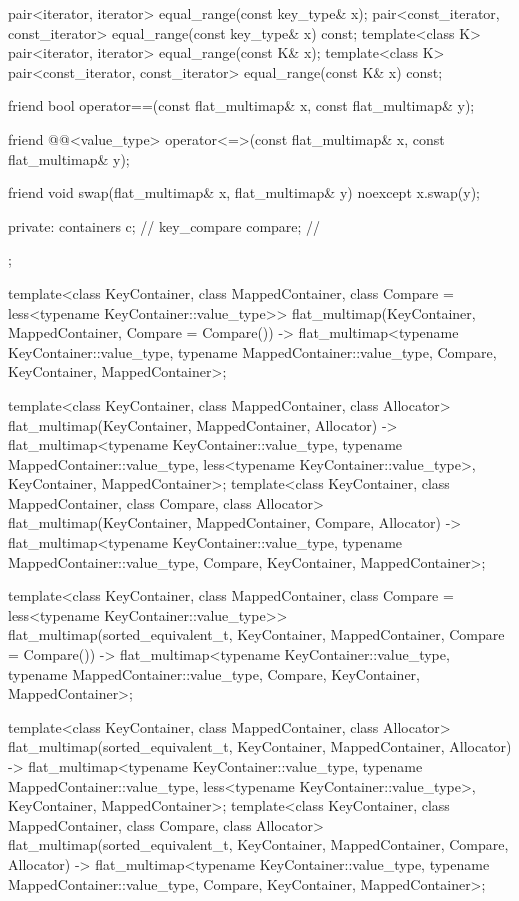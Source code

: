 \begin{codeblock}
{{    pair<iterator, iterator> equal_range(const key_type& x);
    pair<const_iterator, const_iterator> equal_range(const key_type& x) const;
    template<class K>
      pair<iterator, iterator> equal_range(const K& x);
    template<class K>
      pair<const_iterator, const_iterator> equal_range(const K& x) const;

    friend bool operator==(const flat_multimap& x, const flat_multimap& y);

    friend @@<value_type>
      operator<=>(const flat_multimap& x, const flat_multimap& y);

    friend void swap(flat_multimap& x, flat_multimap& y) noexcept
      { x.swap(y); }

  private:
    containers c;               // \expos
    key_compare compare;        // \expos
  };

  template<class KeyContainer, class MappedContainer,
           class Compare = less<typename KeyContainer::value_type>>
    flat_multimap(KeyContainer, MappedContainer, Compare = Compare())
      -> flat_multimap<typename KeyContainer::value_type, typename MappedContainer::value_type,
                       Compare, KeyContainer, MappedContainer>;

  template<class KeyContainer, class MappedContainer, class Allocator>
    flat_multimap(KeyContainer, MappedContainer, Allocator)
      -> flat_multimap<typename KeyContainer::value_type, typename MappedContainer::value_type,
                       less<typename KeyContainer::value_type>, KeyContainer, MappedContainer>;
  template<class KeyContainer, class MappedContainer, class Compare, class Allocator>
    flat_multimap(KeyContainer, MappedContainer, Compare, Allocator)
      -> flat_multimap<typename KeyContainer::value_type, typename MappedContainer::value_type,
                       Compare, KeyContainer, MappedContainer>;

  template<class KeyContainer, class MappedContainer,
           class Compare = less<typename KeyContainer::value_type>>
    flat_multimap(sorted_equivalent_t, KeyContainer, MappedContainer, Compare = Compare())
      -> flat_multimap<typename KeyContainer::value_type, typename MappedContainer::value_type,
                       Compare, KeyContainer, MappedContainer>;

  template<class KeyContainer, class MappedContainer, class Allocator>
    flat_multimap(sorted_equivalent_t, KeyContainer, MappedContainer, Allocator)
      -> flat_multimap<typename KeyContainer::value_type, typename MappedContainer::value_type,
                       less<typename KeyContainer::value_type>, KeyContainer, MappedContainer>;
  template<class KeyContainer, class MappedContainer, class Compare, class Allocator>
    flat_multimap(sorted_equivalent_t, KeyContainer, MappedContainer, Compare, Allocator)
      -> flat_multimap<typename KeyContainer::value_type, typename MappedContainer::value_type,
                       Compare, KeyContainer, MappedContainer>;

}
\end{codeblock}
